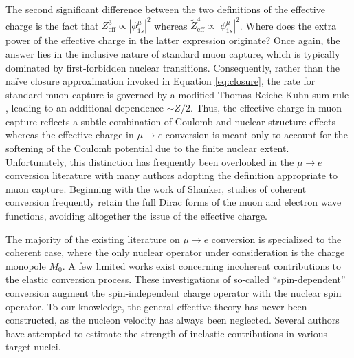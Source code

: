 \documentclass{book}[letterpaper,12pt]
\begin{document}
The second significant difference between the two definitions of the effective charge is the fact that $Z_\mathrm{eff}^3\propto |\phi_{1s}^{\mu}|^2$ whereas $\tilde{Z}_\mathrm{eff}^4\propto |\phi_{1s}^{\mu}|^2$. Where does the extra power of the effective charge in the latter expression originate? Once again, the answer lies in the inclusive nature of standard muon capture, which is typically dominated by first-forbidden nuclear transitions. Consequently, rather than the na\"ive closure approximation invoked in Equation \ref{eq:closure}, the rate for standard muon capture is governed by a modified Thomas-Reiche-Kuhn sum rule \cite{DoDang:1972pc}, leading to an additional dependence $\sim Z/2$. Thus, the effective charge in muon capture reflects a subtle combination of Coulomb and nuclear structure effects whereas the effective charge in $\mu\rightarrow e$ conversion is meant only to account for the softening of the Coulomb potential due to the finite nuclear extent. Unfortunately, this distinction has frequently been overlooked in the $\mu\rightarrow e$ conversion literature with many authors adopting the definition appropriate to muon capture. Beginning with the work of Shanker, studies of coherent conversion frequently retain the full Dirac forms of the muon and electron wave functions, avoiding altogether the issue of the effective charge.

The majority of the existing literature on $\mu\rightarrow e$ conversion is specialized to the coherent case, where the only nuclear operator under consideration is the charge monopole $M_0$. A few limited works exist concerning incoherent contributions to the elastic conversion process. These investigations of so-called ``spin-dependent'' conversion augment the spin-independent charge operator with the nuclear spin operator. To our knowledge, the general effective theory has never been constructed, as the nucleon velocity has always been neglected. Several authors have attempted to estimate the strength of inelastic contributions in various target nuclei.
\end{document}
